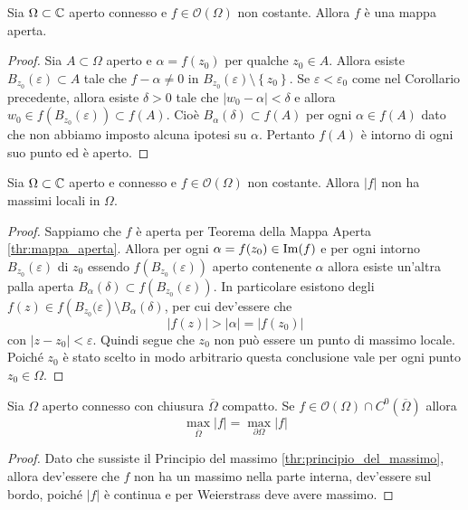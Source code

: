 \begin{theorem}
  \label{thr:mappa_aperta}
  Sia $\Omega \subset \mathbb{C}$ aperto connesso e $f \in \mathcal{O}(\Omega)$ non
  costante. Allora $f$ è una mappa aperta.
\end{theorem}
\begin{proof}
  Sia $A \subset \Omega$ aperto e $\alpha = f(z_0)$ per qualche $z_0 \in A$.
  Allora esiste $B_{z_0}(\varepsilon) \subset A$ tale che $f - \alpha \neq 0$ in
  $B_{z_0}(\varepsilon) \setminus \left\{ z_0 \right\}$. Se $\varepsilon
  < \varepsilon_0$ come nel Corollario precedente, allora esiste $\delta > 0$
  tale che $|w_0 - \alpha| < \delta$ e allora $w_0 \in f\left(
  B_{z_0}(\varepsilon) \right) \subset f(A)$. Cioè $B_{\alpha}(\delta) \subset
  f(A)$ per ogni $\alpha \in f(A)$ dato che non abbiamo imposto alcuna ipotesi
  su $\alpha$. Pertanto $f(A)$ è intorno di ogni suo punto ed è aperto. 
\end{proof}

\begin{theorem}
  \label{thr:principio_del_massimo}
  Sia $\Omega \subset \mathbb{C}$ aperto e connesso e $f \in \mathcal{O}(\Omega)$ non
  costante. Allora $|f|$ non ha massimi locali in $\Omega$. 
\end{theorem}
\begin{proof}
  Sappiamo che $f$ è aperta per Teorema della Mappa Aperta
  \ref{thr:mappa_aperta}. Allora per ogni $\alpha = f(z_0) \in \operatorname{Im}(f)$ e per
  ogni intorno $B_{z_0}(\varepsilon)$ di $z_0$ essendo
  $f \left(B_{z_0}(\varepsilon) \right)$ aperto contenente $\alpha$ allora esiste
  un'altra palla aperta $B_\alpha(\delta) \subset f\left( B_{z_0}(\varepsilon) 
  \right)$. In particolare esistono degli $f(z) \in f\left( B_{z_0}(\varepsilon
  \right) \setminus B_\alpha(\delta)$, per cui dev'essere che 
  \begin{equation*}
    |f(z)| > |\alpha| = |f(z_0)|
  \end{equation*}
  con $|z-z_0| < \varepsilon$. Quindi segue che $z_0$ non può essere un punto
  di massimo locale. Poiché $z_0$ è stato scelto in modo arbitrario questa
  conclusione vale per ogni punto $z_0 \in \Omega$.
\end{proof}

\begin{corollary}
  \label{cor:massimo_sul_bordo}
  Sia $\Omega$ aperto connesso con chiusura $\overline{\Omega}$ compatto. Se $f
  \in \mathcal{O}(\Omega) \cap C^0(\overline{\Omega})$ allora
  \begin{equation*}
    \max_{\overline{\Omega}} |f| = \max_{\partial \Omega} |f|
  \end{equation*}
\end{corollary}
\begin{proof}
  Dato che sussiste il Principio del massimo \ref{thr:principio_del_massimo},
  allora dev'essere che $f$ non ha un massimo nella parte interna, dev'essere
  sul bordo, poiché $|f|$ è continua e per Weierstrass deve avere massimo. 
\end{proof}

